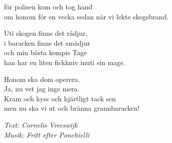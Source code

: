 för polisen kom och tog hand\\
om honom för en vecka sedan när vi lekte skogsbrand.\par
\vspace{10pt}
Uti skogen finns det rådjur,\\
i baracken finns det smådjur\\
och min bästa kompis Tage\\
han har en liten fickkniv inuti sin mage.\par
\vspace{10pt}
Honom ska dom operera.\\
Ja, nu vet jag inge mera.\\
Kram och kyss och hjärtligt tack sen\\
men nu ska vi ut och bränna grannbaracken!\par
\vspace{10pt}
{\footnotesize\textit{Text: Cornelis Vreeswijk \\ Musik: Fritt efter Ponchielli}}
